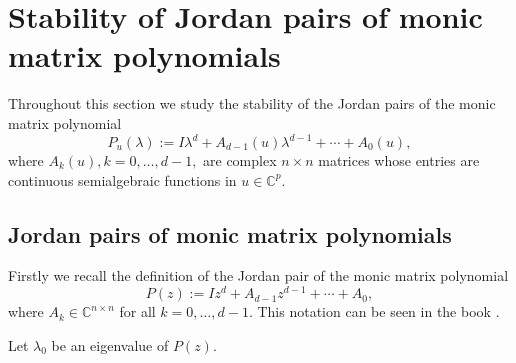 \documentclass[10pt,reqno]{amsart}
\theoremstyle{break-italic}
\theoremstyle{break-italic}
\theoremstyle{break-italic}
\theoremstyle{break-italic}
\theoremstyle{break-italic}
\theoremstyle{break-italic}
\theoremstyle{break-italic}
\theoremstyle{break-italic}
\theoremstyle{break-roman}
\theoremstyle{standard}
\theoremstyle{varthm-roman}
\theoremstyle{varthm-italic}
\theoremstyle{varthm-roman-break}
\theoremstyle{varthm-italic-break}
\theoremstyle{varthm-roman-no-punctuation}
\theoremstyle{varthm-italic-no-punctuation}
\numberwithin{equation}{section}
\begin{document}
\section{Stability of Jordan pairs of monic matrix polynomials} \label{jordanpair}

Throughout this section we study the stability of the  Jordan pairs of the  monic matrix polynomial
$$P_{u}(\lambda) := I \lambda^d  + A_{d - 1}(u) \lambda^{d - 1}  + \cdots + A_{0}(u),$$
where   $A_{k}(u), k = 0, \ldots, d - 1,$ are complex $n \times n$ matrices whose entries are continuous semialgebraic functions in $u \in \mathbb{C}^p.$

\subsection{Jordan pairs of monic matrix polynomials}
Firstly we recall  the definition of the Jordan pair of the monic matrix polynomial
$$P(z) := I  z^d  + A_{d - 1}  z^{d - 1}  + \cdots + A_{0},$$
 where $A_k \in \mathbb C^{n \times n}$ for all  $k = 0, \ldots, d - 1$.  This notation can be seen in the book \cite{Gohberg1982}.

Let $\lambda_0$ be an eigenvalue of $P(z)$.
\end{document}
